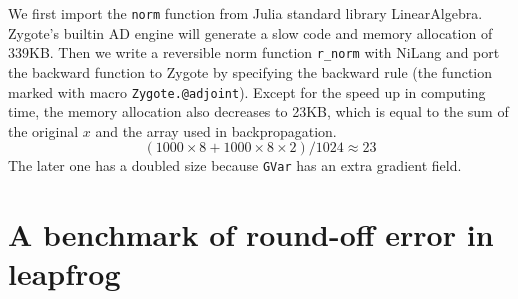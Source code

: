 \documentclass{article}
\newcommand{\<}{\langle}
\renewcommand{\>}{\rangle}
\theoremstyle{definition}\newtheorem{definition}{\textit{Definition}}
\begin{document}
We first import the \texttt{norm} function from Julia standard library LinearAlgebra.
Zygote's builtin AD engine will generate a slow code and memory allocation of 339KB.
Then we write a reversible norm function \texttt{r\_norm} with NiLang and port the backward function to Zygote by specifying the backward rule (the function marked with macro \texttt{Zygote.@adjoint}).
Except for the speed up in computing time, the memory allocation also decreases to 23KB, which is equal to the sum of the original $x$ and the array used in backpropagation.
$$(1000\times 8 + 1000\times 8\times 2)/1024 \approx 23$$
The later one has a doubled size because \texttt{GVar} has an extra gradient field.

\section{A benchmark of round-off error in leapfrog}\label{app:roundoff}

\end{document}
